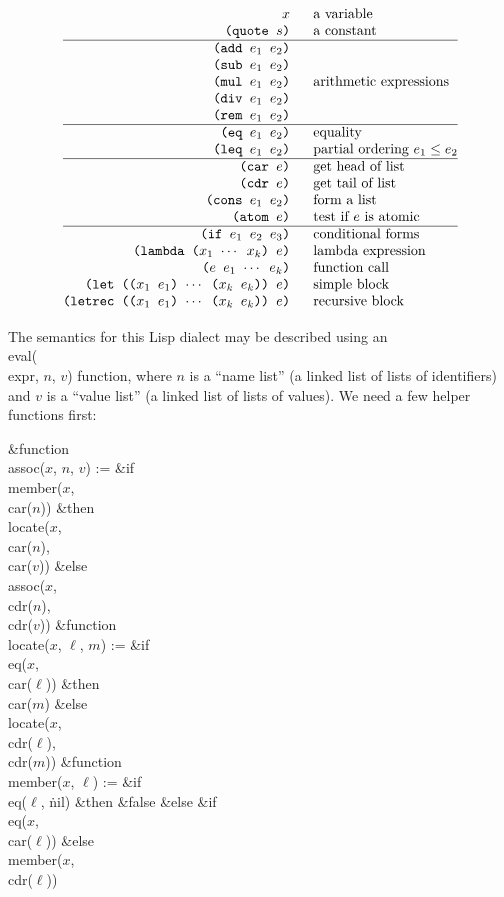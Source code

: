 $$\vbox{\offinterlineskip
\halign{ \hfil# &\strut\quad#\hfil\cr
$x$ & a variable\cr
{\tt (quote $s$)} & a constant\cr
\noalign{\hrule}
{\tt (add $e_{1}$ $e_{2}$)} & \cr
{\tt (sub $e_{1}$ $e_{2}$)} & \cr
{\tt (mul $e_{1}$ $e_{2}$)} & arithmetic expressions \cr
{\tt (div $e_{1}$ $e_{2}$)} & \cr
{\tt (rem $e_{1}$ $e_{2}$)} & \cr
\noalign{\hrule}
{\tt (eq $e_{1}$ $e_{2}$)} & equality\cr
{\tt (leq $e_{1}$ $e_{2}$)} & partial ordering $e_{1}\leq e_{2}$\cr
\noalign{\hrule}
{\tt (car $e$)} & get head of list\cr
{\tt (cdr $e$)} & get tail of list\cr
{\tt (cons $e_{1}$ $e_{2}$)} & form a list\cr
{\tt (atom $e$)} & test if $e$ is atomic\cr
\noalign{\hrule}
{\tt (if $e_{1}$ $e_{2}$ $e_{3}$)} & conditional forms\cr
{\tt (lambda ($x_{1}$ $\cdots$ $x_{k}$) $e$)} & lambda expression\cr
{\tt ($e$ $e_{1}$ $\cdots$ $e_{k}$)} & function call\cr
{\tt (let (($x_{1}$ $e_{1}$) $\cdots$ ($x_{k}$ $e_{k}$)) $e$)} & simple block%
\cr
{\tt (letrec (($x_{1}$ $e_{1}$) $\cdots$ ($x_{k}$ $e_{k}$)) $e$)} & recursive
block\cr}}$$

\fi

\enspace\ignorespaces%
The semantics for this Lisp dialect may be described using
an \\{eval}(\\{expr}, $n$, $v$) function, where $n$ is a ``name list''
(a linked list of lists of identifiers)
and $v$ is a ``value list'' (a linked list of lists of values). We
need a few helper functions first:

{
\&{function} \\{assoc}($x$, $n$, $v$) := \1\6
\&{if} \\{member}($x$, \\{car}($n$))\6
\&{then} \\{locate}($x$, \\{car}($n$), \\{car}($v$))\6
\&{else} \\{assoc}($x$, \\{cdr}($n$), \\{cdr}($v$))\2\7
\&{function} \\{locate}($x$, $\ell$, $m$) :=\1\6
\&{if} \\{eq}($x$, \\{car}($\ell$))\6
\&{then} \\{car}($m$)\6
\&{else} \\{locate}($x$, \\{cdr}($\ell$), \\{cdr}($m$))\2\7
\&{function} \\{member}($x$, $\ell$) :=\1\6
\&{if} \\{eq}($\ell$, \.{nil})\6
\&{then} \&{false}\6
\&{else} \&{if} \\{eq}($x$, \\{car}($\ell$))\6
\&{else} \\{member}($x$, \\{cdr}($\ell$))\2
\par}

